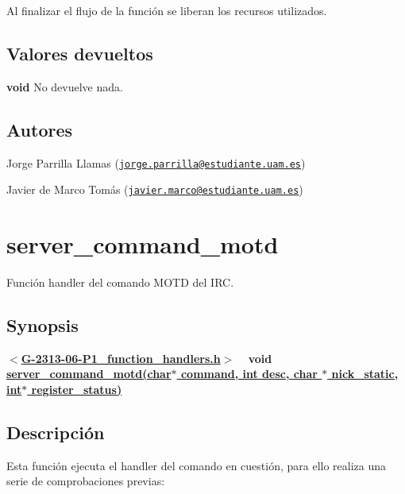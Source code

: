 Al finalizar el flujo de la función se liberan los recursos utilizados.\hypertarget{server_command_topic_return_topic}{}\subsection{Valores devueltos}\label{server_command_topic_return_topic}

\begin{DoxyItemize}
\item {\bfseries void} No devuelve nada. 
\end{DoxyItemize}\hypertarget{server_command_topic_authors_topic}{}\subsection{Autores}\label{server_command_topic_authors_topic}

\begin{DoxyItemize}
\item Jorge Parrilla Llamas (\href{mailto:jorge.parrilla@estudiante.uam.es}{\tt jorge.\+parrilla@estudiante.\+uam.\+es}) 
\item Javier de Marco Tomás (\href{mailto:javier.marco@estudiante.uam.es}{\tt javier.\+marco@estudiante.\+uam.\+es}) 
\end{DoxyItemize}\hypertarget{server_command_motd}{}\section{server\+\_\+command\+\_\+motd}\label{server_command_motd}
Función handler del comando M\+O\+T\+D del I\+R\+C.\hypertarget{server_command_motd_synopsis_motd}{}\subsection{Synopsis}\label{server_command_motd_synopsis_motd}
{ {\bfseries $<$\hyperlink{G-2313-06-P1__function__handlers_8h}{G-\/2313-\/06-\/\+P1\+\_\+function\+\_\+handlers.\+h}$>$} ~\newline
 {\bfseries void \hyperlink{G-2313-06-P1__function__handlers_8c_a1258d3bdf779b82c3f952bdde3d62631}{server\+\_\+command\+\_\+motd(char$\ast$ command, int desc, char $\ast$ nick\+\_\+static, int$\ast$ register\+\_\+status)}} } \hypertarget{server_command_motd_descripcion_motd}{}\subsection{Descripción}\label{server_command_motd_descripcion_motd}
Esta función ejecuta el handler del comando en cuestión, para ello realiza una serie de comprobaciones previas\+:


